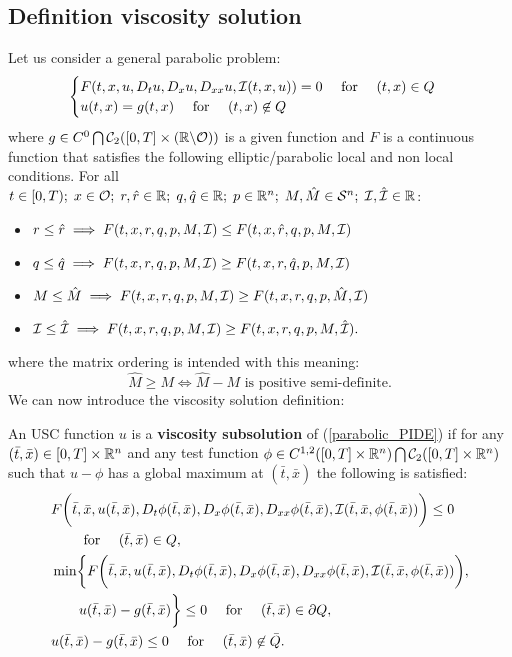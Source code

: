 \subsection{Definition viscosity solution}


Let us consider a general parabolic problem:
\begin{equation}\label{parabolic_PIDE}
\begin{cases}
F(t,x,u,D_t u,D_x u,D_{xx}u,\mathcal{I}(t,x,u)) = 0 \quad \mbox{ for } \quad (t,x) \in Q \\
u(t,x) = g(t,x) \quad \mbox{ for } \quad (t,x) \not \in Q
\end{cases}
\end{equation}
where $g \in C^0 \bigcap \mathcal{C}_2([0,T] \times (\mathbb{R}\backslash \mathcal{O}))$ is a given function and 
$F$ is a continuous function that satisfies the following elliptic/parabolic local and non local conditions. 
For all $t\in [0,T); \; x \in \mathcal{O}; \; r,\hat r \in \mathbb{R}; \; q,\hat q \in \mathbb{R}; \; 
p \in \mathbb{R}^n; \; M,\hat M \in \mathcal{S}^n; \; \mathcal{I}, \hat {\mathcal{I}} \in \mathbb{R}$:
\begin{itemize}
 \item $r \leq \hat r \; \Longrightarrow  \; F(t,x,r,q,p,M,\mathcal{I}) \leq F(t,x,\hat r,q,p,M,\mathcal{I}) $
 \item $q \leq \hat q \; \Longrightarrow  \; F(t,x,r,q,p,M,\mathcal{I}) \geq F(t,x,r,\hat q,p,M,\mathcal{I}) $
 \item $M \leq \hat M \; \Longrightarrow  \; F(t,x,r,q,p,M,\mathcal{I}) \geq F(t,x,r,q,p,\hat M,\mathcal{I}) $
 \item $\mathcal{I} \leq \hat {\mathcal{I}} \; \Longrightarrow  \; F(t,x,r,q,p,M,\mathcal{I}) \geq F(t,x,r,q,p,M,\hat {\mathcal{I}}). $
\end{itemize}
where the matrix ordering is intended with this meaning:
$$ \hat M \geq M \Leftrightarrow \hat M - M \mbox{ is positive semi-definite.} $$
We can now introduce the viscosity solution definition:
\begin{Definition}
 An USC function $u$ is a \textbf{viscosity subsolution} of (\ref{parabolic_PIDE})
 if for any $(\bar t, \bar x) \in [0,T]\times \mathbb{R}^n$ and any test function $ \phi \in C^{1,2}([0,T] \times \mathbb{R}^n) \bigcap \mathcal{C}_2([0,T] \times \mathbb{R}^n)$ 
 such that $u-\phi$ has a global maximum at $(\bar t,\bar x)$ the following is satisfied:
\begin{align}\label{subsolution}
 & F\biggl( \bar t,\bar x,u(\bar t,\bar x),D_t \phi(\bar t,\bar x), D_x \phi(\bar t,\bar x),D_{xx}\phi(\bar t,\bar x),\mathcal{I}(\bar t, \bar x,\phi(\bar t,\bar x))\biggr) \leq 0 \\ \nonumber
 &  \quad \quad \mbox{ for } \quad (\bar t,\bar x) \in Q, \\ \nonumber
 & \min \biggl\{ F \biggl( \bar t,\bar x,u(\bar t,\bar x), D_t \phi(\bar t,\bar x), D_x \phi(\bar t,\bar x), 
 D_{xx}\phi(\bar t,\bar x),\mathcal{I}(\bar t, \bar x,\phi(\bar t,\bar x)) \biggr) ,\\ \nonumber 
 & \quad \quad u(\bar t,\bar x) - g(\bar t,\bar x) \biggr\} \leq 0  \quad  \mbox{ for } \quad (\bar t,\bar x) \in \partial Q, \\ \nonumber
 & u(\bar t,\bar x) - g(\bar t,\bar x) \leq 0  \quad  \mbox{ for } \quad (\bar t,\bar x) \not \in \bar Q.
\end{align}
\end{Definition}
